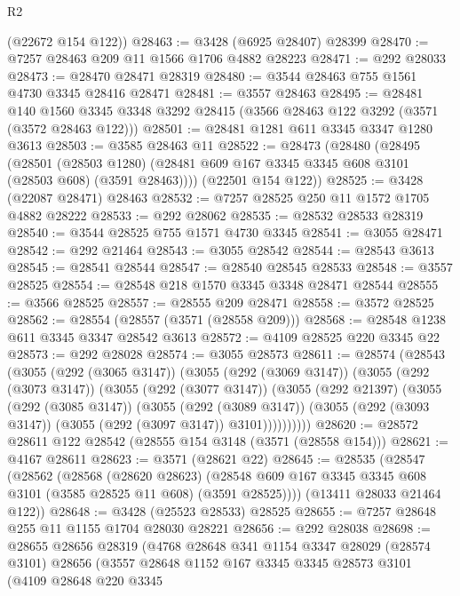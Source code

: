 \begin{lexlean}{R2}
\begin{coremodule}
      (@22672 @154 @122))
@28463 := @3428 (@6925 @28407) @28399
@28470 := @7257 @28463 @209 @11 @1566 @1706 @4882 @28223
@28471 := @292 @28033
@28473 := @28470 @28471 @28319
@28480 := @3544 @28463 @755 @1561 @4730 @3345 @28416 @28471
@28481 := @3557 @28463
@28495 := @28481
    @140
    @1560
    @3345
    @3348
    @3292
    @28415
    (@3566 @28463 @122 @3292 (@3571 (@3572 @28463 @122)))
@28501 := @28481 @1281 @611 @3345 @3347 @1280 @3613
@28503 := @3585 @28463 @11
@28522 := @28473
    (@28480
      (@28495
        (@28501
          (@28503 @1280)
          (@28481 @609 @167 @3345 @3345 @608 @3101 (@28503 @608) (@3591 @28463))))
      (@22501 @154 @122))
@28525 := @3428 (@22087 @28471) @28463
@28532 := @7257 @28525 @250 @11 @1572 @1705 @4882 @28222
@28533 := @292 @28062
@28535 := @28532 @28533 @28319
@28540 := @3544 @28525 @755 @1571 @4730 @3345
@28541 := @3055 @28471
@28542 := @292 @21464
@28543 := @3055 @28542
@28544 := @28543 @3613
@28545 := @28541 @28544
@28547 := @28540 @28545 @28533
@28548 := @3557 @28525
@28554 := @28548 @218 @1570 @3345 @3348 @28471 @28544
@28555 := @3566 @28525
@28557 := @28555 @209 @28471
@28558 := @3572 @28525
@28562 := @28554 (@28557 (@3571 (@28558 @209)))
@28568 := @28548 @1238 @611 @3345 @3347 @28542 @3613
@28572 := @4109 @28525 @220 @3345 @22
@28573 := @292 @28028
@28574 := @3055 @28573
@28611 := @28574
    (@28543
      (@3055
        (@292 (@3065 @3147))
        (@3055
          (@292 (@3069 @3147))
          (@3055
            (@292 (@3073 @3147))
            (@3055
              (@292 (@3077 @3147))
              (@3055
                (@292 @21397)
                (@3055
                  (@292 (@3085 @3147))
                  (@3055
                    (@292 (@3089 @3147))
                    (@3055 (@292 (@3093 @3147)) (@3055 (@292 (@3097 @3147)) @3101))))))))))
@28620 := @28572 @28611 @122 @28542 (@28555 @154 @3148 (@3571 (@28558 @154)))
@28621 := @4167 @28611
@28623 := @3571 (@28621 @22)
@28645 := @28535
    (@28547
      (@28562
        (@28568
          (@28620 @28623)
          (@28548 @609 @167 @3345 @3345 @608 @3101 (@3585 @28525 @11 @608) (@3591 @28525))))
      (@13411 @28033 @21464 @122))
@28648 := @3428 (@25523 @28533) @28525
@28655 := @7257 @28648 @255 @11 @1155 @1704 @28030 @28221
@28656 := @292 @28038
@28698 := @28655
    @28656
    @28319
    (@4768
      @28648
      @341
      @1154
      @3347
      @28029
      (@28574 @3101)
      @28656
      (@3557
        @28648
        @1152
        @167
        @3345
        @3345
        @28573
        @3101
        (@4109
          @28648
          @220
          @3345

\end{coremodule}
\end{lexlean}
